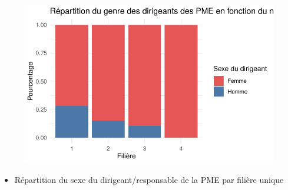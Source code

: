 \documentclass[
  letterpaper,
  DIV=11,
  numbers=noendperiod]{scrartcl}
\providecommand{\tightlist}{%
  \setlength{\itemsep}{0pt}\setlength{\parskip}{0pt}}\usepackage{longtable,booktabs,array}
\begin{document}
\begin{figure}[H]

{\centering \includegraphics{projet_R_files/figure-pdf/unnamed-chunk-31-1.pdf}

}

\end{figure}

\begin{itemize}
\tightlist
\item
  Répartition du sexe du dirigeant/responsable de la PME par filière
  unique
\end{itemize}
\end{document}
